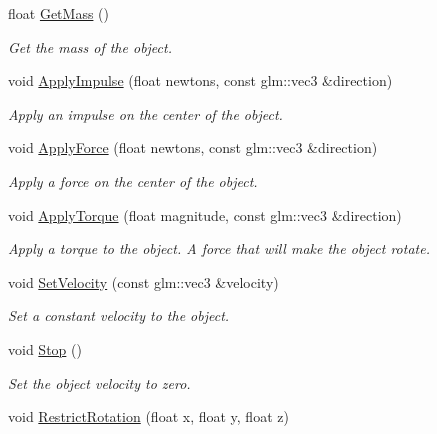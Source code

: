 \begin{DoxyCompactItemize}
float \hyperlink{classTarbora_1_1RigidBody_ad3bd01b11639862744797e2bb9c3fca0}{Get\+Mass} ()
\begin{DoxyCompactList}\small\item\em Get the mass of the object. \end{DoxyCompactList}\item 
void \hyperlink{classTarbora_1_1RigidBody_a55a0003f237d0f1a324350bcf9bbfd28}{Apply\+Impulse} (float newtons, const glm\+::vec3 \&direction)
\begin{DoxyCompactList}\small\item\em Apply an impulse on the center of the object. \end{DoxyCompactList}\item 
void \hyperlink{classTarbora_1_1RigidBody_ae60a0e3d1f035698dfc11a117c28999b}{Apply\+Force} (float newtons, const glm\+::vec3 \&direction)
\begin{DoxyCompactList}\small\item\em Apply a force on the center of the object. \end{DoxyCompactList}\item 
void \hyperlink{classTarbora_1_1RigidBody_a025666d2545230e12b546b68d955871c}{Apply\+Torque} (float magnitude, const glm\+::vec3 \&direction)
\begin{DoxyCompactList}\small\item\em Apply a torque to the object. A force that will make the object rotate. \end{DoxyCompactList}\item 
void \hyperlink{classTarbora_1_1RigidBody_adeeb63271e410f12a8ccc3b7d9cb95fb}{Set\+Velocity} (const glm\+::vec3 \&velocity)
\begin{DoxyCompactList}\small\item\em Set a constant velocity to the object. \end{DoxyCompactList}\item 
\mbox{\label{classTarbora_1_1RigidBody_a9e1f015de3b1ad6ad54b93d365b6981f}} 
void \hyperlink{classTarbora_1_1RigidBody_a9e1f015de3b1ad6ad54b93d365b6981f}{Stop} ()
\begin{DoxyCompactList}\small\item\em Set the object velocity to zero. \end{DoxyCompactList}\item 
void \hyperlink{classTarbora_1_1RigidBody_aaf5efa034c4e9578612751b25d599106}{Restrict\+Rotation} (float x, float y, float z)

\end{DoxyCompactItemize}
